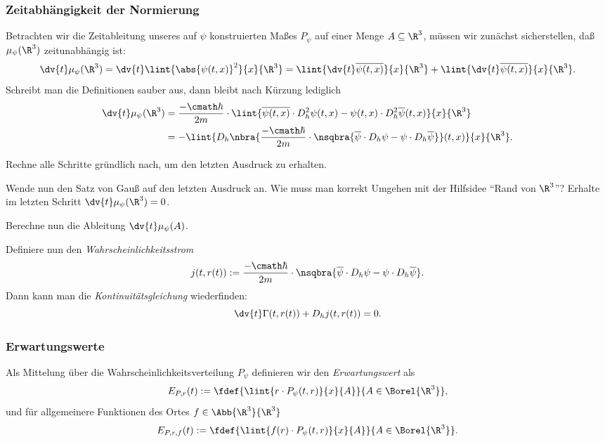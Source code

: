 \documentclass{subfiles}
\begin{document}
        \subsubsection*{Zeitabhängigkeit der Normierung}
            Betrachten wir die Zeitableitung unseres auf $\psi$ konstruierten Maßes $P_\psi$ auf einer Menge $A\subseteq\R^3$, müssen wir zunächst sicherstellen, daß $\mu_\psi(\R^3)$ zeitunabhängig ist:
            \[\dv{t}\mu_\psi(\R^3) = \dv{t}\lint{\abs{\psi(t,x)}^2}{x}{\R^3} = \lint{\dv{t}\overline{\psi(t,x)}}{x}{\R^3} + \lint{\dv{t}\overline{\psi(t,x)}}{x}{\R^3}.\]
            Schreibt man die Definitionen sauber aus, dann bleibt nach Kürzung lediglich 
            \begin{align*}
                \dv{t}\mu_\psi(\R^3) &= \frac{-\cmath\hbar}{2m}\cdot\lint{\overline{\psi(t,x)}\cdot D_{h}^2\psi(t,x) - \psi(t,x)\cdot D_h^2\overline{\psi}(t,x)}{x}{\R^3} \\
                &= -\lint{D_h\nbra{\frac{-\cmath\hbar}{2m}\cdot\nsqbra{\overline{\psi}\cdot D_h\psi - \psi\cdot D_h\overline{\psi}}}(t,x)}{x}{\R^3}.
            \end{align*}
            \begin{Aufgabe}
                \nr{} Rechne alle Schritte gründlich nach, um den letzten Ausdruck zu erhalten. 

                \nr{} Wende nun den Satz von Gauß auf den letzten Ausdruck an. Wie muss man korrekt Umgehen mit der Hilfsidee \enquote{Rand von $\R^3$}? Erhalte im letzten Schritt $\dv{t}\mu_\psi(\R^3) = 0$. 

                \nr{} Berechne nun die Ableitung $\dv{t}\mu_\psi(A)$. 
            \end{Aufgabe}
            \noindent Definiere nun den \emph{Wahrscheinlichkeitsstrom}
            \[j(t,r(t)) := \frac{-\cmath\hbar}{2m}\cdot\nsqbra{\overline{\psi}\cdot D_h\psi - \psi\cdot D_h\overline{\psi}}.\]
            Dann kann man die \emph{Kontinuitätsgleichung} wiederfinden:
            \[\dv{t}\Gamma(t,r(t)) + D_hj(t,r(t)) = 0.\]

        \subsubsection*{Erwartungswerte}
            Als Mittelung über die Wahrscheinlichkeitsverteilung $P_\psi$ definieren wir den \emph{Erwartungswert} als 
            \[E_{P,r}(t):=\fdef{\lint{r\cdot P_\psi(t,r)}{x}{A}}{A\in\Borel{\R^3}},\]
            und für allgemeinere Funktionen des Ortes $f\in\Abb{\R^3}{\R^3}$ 
            \[E_{P,r,f}(t):=\fdef{\lint{f(r)\cdot P_\psi(t,r)}{x}{A}}{A\in\Borel{\R^3}}.\]
\end{document}
